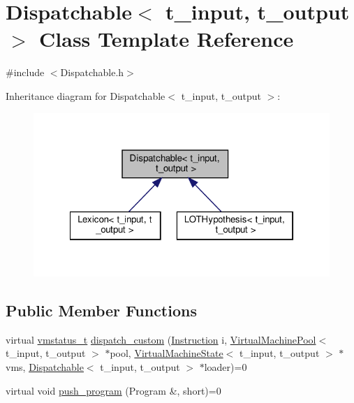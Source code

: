 \hypertarget{class_dispatchable}{}\section{Dispatchable$<$ t\+\_\+input, t\+\_\+output $>$ Class Template Reference}
\label{class_dispatchable}


{\ttfamily \#include $<$Dispatchable.\+h$>$}



Inheritance diagram for Dispatchable$<$ t\+\_\+input, t\+\_\+output $>$\+:\nopagebreak
\begin{figure}[H]
\begin{center}
\leavevmode
\includegraphics[width=322pt]{class_dispatchable__inherit__graph}
\end{center}
\end{figure}
\subsection*{Public Member Functions}
\begin{DoxyCompactItemize}
\item 
virtual \hyperlink{_instruction_8h_a6202215407ab29590bb936ca2996cf64}{vmstatus\+\_\+t} \hyperlink{class_dispatchable_a6d2bd844b0e55378d29ed85e718d0a77}{dispatch\+\_\+custom} (\hyperlink{class_instruction}{Instruction} i, \hyperlink{class_virtual_machine_pool}{Virtual\+Machine\+Pool}$<$ t\+\_\+input, t\+\_\+output $>$ $\ast$pool, \hyperlink{class_virtual_machine_state}{Virtual\+Machine\+State}$<$ t\+\_\+input, t\+\_\+output $>$ $\ast$vms, \hyperlink{class_dispatchable}{Dispatchable}$<$ t\+\_\+input, t\+\_\+output $>$ $\ast$loader)=0
\item 
virtual void \hyperlink{class_dispatchable_a9339c2906f7c8dadbe1d0ca79dd9bb11}{push\+\_\+program} (Program \&, short)=0
\end{DoxyCompactItemize}


